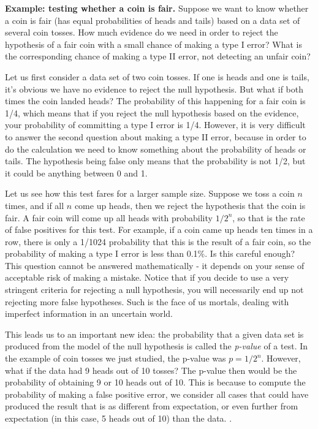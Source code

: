 \documentclass[
]{book}
\theoremstyle{definition}
\theoremstyle{definition}
\theoremstyle{definition}
\theoremstyle{remark}
\begin{document}
\textbf{Example: testing whether a coin is fair.} Suppose we want to know whether a coin is fair (has equal probabilities of heads and tails) based on a data set of several coin tosses. How much evidence do we need in order to reject the hypothesis of a fair coin with a small chance of making a type I error? What is the corresponding chance of making a type II error, not detecting an unfair coin?

Let us first consider a data set of two coin tosses. If one is heads and one is tails, it's obvious we have no evidence to reject the null hypothesis. But what if both times the coin landed heads? The probability of this happening for a fair coin is 1/4, which means that if you reject the null hypothesis based on the evidence, your probability of committing a type I error is 1/4. However, it is very difficult to answer the second question about making a type II error, because in order to do the calculation we need to know something about the probability of heads or tails. The hypothesis being false only means that the probability is not 1/2, but it could be anything between 0 and 1.

Let us see how this test fares for a larger sample size. Suppose we toss a coin \(n\) times, and if all \(n\) come up heads, then we reject the hypothesis that the coin is fair. A fair coin will come up all heads with probability \(1/2^n\), so that is the rate of false positives for this test. For example, if a coin came up heads ten times in a row, there is only a 1/1024 probability that this is the result of a fair coin, so the probability of making a type I error is less than 0.1\%. Is this careful enough? This question cannot be answered mathematically - it depends on your sense of acceptable risk of making a mistake. Notice that if you decide to use a very stringent criteria for rejecting a null hypothesis, you will necessarily end up not rejecting more false hypotheses. Such is the face of us mortals, dealing with imperfect information in an uncertain world.

This leads us to an important new idea: the probability that a given data set is produced from the model of the null hypothesis is called the \emph{p-value} of a test. In the example of coin tosses we just studied, the p-value was \(p=1/2^n\). However, what if the data had 9 heads out of 10 tosses? The p-value then would be the probability of obtaining 9 or 10 heads out of 10. This is because to compute the probability of making a false positive error, we consider all cases that could have produced the result that is as different from expectation, or even further from expectation (in this case, 5 heads out of 10) than the data. \citep{whitlock_analysis_2008}.
\end{document}
